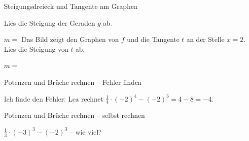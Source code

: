 \begin{aufgabe}{Steigungsdreieck und Tangente am Graphen}
\begin{teile}
\teil Lies die Steigung der Geraden $g$ ab.

\begin{ksys}[xmin=-3,xmax=4,ymin=-2,ymax=4,ablesen]  \end{ksys}
$m = $ \leerfeld
\teil Das Bild zeigt den Graphen von $f$ und die Tangente $t$ an der Stelle $x = 2$. Lies die Steigung von $t$ ab.

\begin{ksys}[xmin=-2,xmax=5,ymin=-2,ymax=5,ablesen]   \end{ksys}
$m = $ \leerfeld
\end{teile}
\end{aufgabe}

\begin{aufgabe}{Potenzen und Brüche rechnen – Fehler finden}
\begin{teile}
\teil Ich finde den Fehler: Lea rechnet $\frac{1}{4} \cdot (-2)^4 - (-2)^3 = 4 - 8 = -4$.
\end{teile}
\end{aufgabe}

\begin{aufgabe}{Potenzen und Brüche rechnen – selbst rechnen}
\begin{teile}
\teil $\frac{1}{3} \cdot (-3)^3 - (-2)^3$ – wie viel? \leerfeld
\end{teile}
\end{aufgabe}
